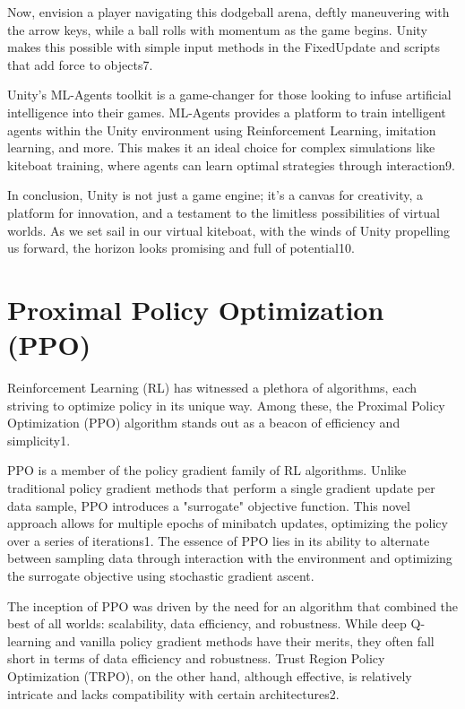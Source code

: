 Now, envision a player navigating this dodgeball arena, deftly maneuvering with the arrow keys, while a ball rolls with momentum as the game begins. Unity makes this possible with simple input methods in the FixedUpdate and scripts that add force to objects7.

Unity's ML-Agents toolkit is a game-changer for those looking to infuse artificial intelligence into their games. ML-Agents provides a platform to train intelligent agents within the Unity environment using Reinforcement Learning, imitation learning, and more. This makes it an ideal choice for complex simulations like kiteboat training, where agents can learn optimal strategies through interaction9.

In conclusion, Unity is not just a game engine; it's a canvas for creativity, a platform for innovation, and a testament to the limitless possibilities of virtual worlds. As we set sail in our virtual kiteboat, with the winds of Unity propelling us forward, the horizon looks promising and full of potential10.

\section{Proximal Policy Optimization (PPO)}

Reinforcement Learning (RL) has witnessed a plethora of algorithms, each striving to optimize policy in its unique way. Among these, the Proximal Policy Optimization (PPO) algorithm stands out as a beacon of efficiency and simplicity1.

PPO is a member of the policy gradient family of RL algorithms. Unlike traditional policy gradient methods that perform a single gradient update per data sample, PPO introduces a "surrogate" objective function. This novel approach allows for multiple epochs of minibatch updates, optimizing the policy over a series of iterations1. The essence of PPO lies in its ability to alternate between sampling data through interaction with the environment and optimizing the surrogate objective using stochastic gradient ascent.

The inception of PPO was driven by the need for an algorithm that combined the best of all worlds: scalability, data efficiency, and robustness. While deep Q-learning and vanilla policy gradient methods have their merits, they often fall short in terms of data efficiency and robustness. Trust Region Policy Optimization (TRPO), on the other hand, although effective, is relatively intricate and lacks compatibility with certain architectures2.

